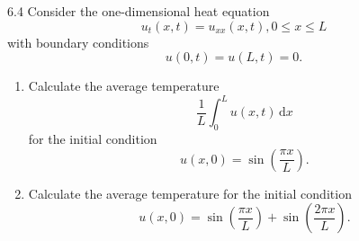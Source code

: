 


\begin{problem}{6.4}
  Consider the one-dimensional heat equation
\[ 
u_t(x,t) = u_{x x}(x,t), 0 \leq x \leq L
\]
with boundary conditions
\[ 
u(0,t) = u(L,t) = 0
.\]

\begin{enumerate}[label=(\alph*)]
  \item Calculate the average temperature
    \begin{equation*}
      \frac{1}{L} \int_{0}^{L} u(x,t) \, \mathrm{d}x 
    \end{equation*}
    for the initial condition
    \begin{equation*}
      u(x,0) = \sin \left( \frac{\pi x}{L} \right)
    .\end{equation*}
  \item Calculate the average temperature for the initial condition
    \begin{equation*}
      u(x,0) = \sin \left( \frac{\pi x}{L} \right) + \sin \left( \frac{2 \pi x}{L} \right)
    .\end{equation*}
\end{enumerate}
\end{problem}

